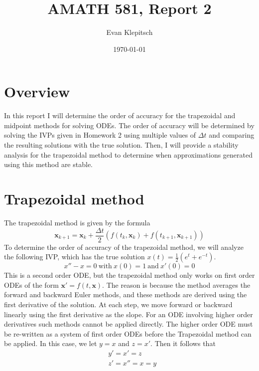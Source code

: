 \documentclass{article}
\title{AMATH 581, Report 2}
\author{Evan Klepitsch}
\date{\today}
\begin{document}
\maketitle
\section{Overview}
In this report I will determine the order of accuracy for the trapezoidal and midpoint methods for solving ODEs.  The order of accuracy will be determined by solving the IVPs given in Homework 2 using multiple values of $\Delta t$ and comparing the resulting solutions with the true solution. Then, I will provide a stability analysis for the trapezoidal method to determine when approximations generated using this method are stable.
\section{Trapezoidal method}
The trapezoidal method is given by the formula
\begin{equation} \label{eq:trapezoidal_method}
\bm{x}_{k+1} = \bm{x}_k + \frac{\Delta t}{2}(f(t_k,\bm{x}_k) + f(t_{k+1},\bm{x}_{k+1}))
\end{equation}
To determine the order of accuracy of the trapezoidal method, we will analyze the following IVP, which has the true solution \begin{math}
x(t) = \frac{1}{2}(e^t + e^{-t})
\end{math}. \begin{equation} \label{eq:trapezoidal_ivp}
x'' - x = 0\ \textrm{with}\ x(0) = 1\  \textrm{and}\ x'(0) = 0
\end{equation}
This is a second order ODE, but the trapezoidal method only works on first order ODEs of the form \begin{math}\bm{x}' = f(t,\bm{x})\end{math}. The reason is because the method averages the forward and backward Euler methods, and these methods are derived using the first derivative of the solution. At each step, we move forward or backward linearly using the first derivative as the slope. For an ODE involving higher order derivatives such methods cannot be applied directly. The higher order ODE must be re-written as a system of first order ODEs before the Trapezoidal method can be applied. In this case, we let \(y = x\) and \(z = x'\). Then it follows that
\begin{equation}
\begin{split}
& y' = x' = z \\
& z' = x'' = x = y
\end{split}
\end{equation}
\end{document}
